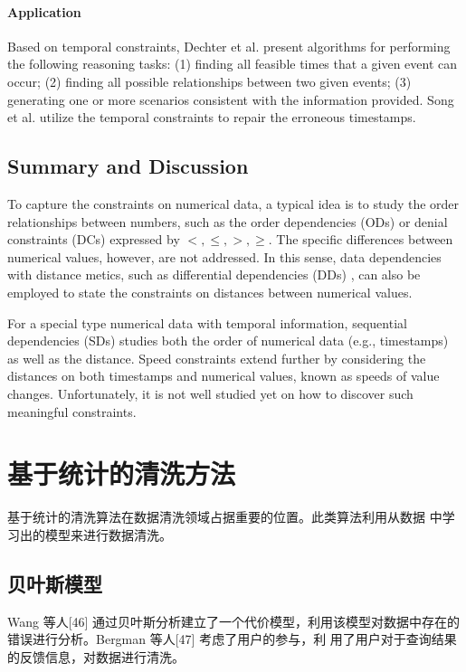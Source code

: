 \documentclass{article}
\begin{document}
\paragraph{Application}
Based on temporal constraints, Dechter et al. \cite{DBLP:journals/ai/DechterMP91} present algorithms for performing the following reasoning tasks:
(1) finding all feasible times that a given event can occur;
(2) finding all possible relationships between two given events;
(3) generating one or more scenarios consistent with the information provided.
Song et al. \cite{DBLP:journals/pvldb/SongC016}
utilize the temporal constraints to repair the erroneous timestamps.



\subsection{Summary and Discussion}

To capture the constraints on numerical data, a typical idea is to study the order relationships between numbers, 
such as the order dependencies (ODs) \cite{DBLP:conf/sigmod/DongH82} or denial constraints (DCs) \cite{DBLP:conf/dbpl/BertossiBFL05,DBLP:journals/is/BertossiBFL08} expressed by $<,\leq,>,\geq$.
The specific differences between numerical values, however, are not addressed. 
In this sense, data dependencies with distance metics, such as differential dependencies (DDs) \cite{DBLP:journals/tods/Song011}, can also be employed to state the constraints on distances between numerical values.

For a special type numerical data with temporal information, sequential dependencies (SDs) \cite{DBLP:journals/pvldb/GolabKKSS09} studies both the order of numerical data (e.g., timestamps) as well as the distance. 
Speed constraints \cite{DBLP:conf/sigmod/SongZWY15} extend further by considering the distances on both timestamps and numerical values, known as speeds of value changes.  
Unfortunately, it is not well studied yet on how to discover such meaningful constraints. 

\section{基于统计的清洗方法}
基于统计的清洗算法在数据清洗领域占据重要的位置。此类算法利用从数据 中学习出的模型来进行数据清洗。 

\subsection{贝叶斯模型}
Wang 等人[46] 通过贝叶斯分析建立了一个代价模型，利用该模型对数据中存在的错误进行分析。Bergman 等人[47] 考虑了用户的参与，利 用了用户对于查询结果的反馈信息，对数据进行清洗。  
\end{document}
